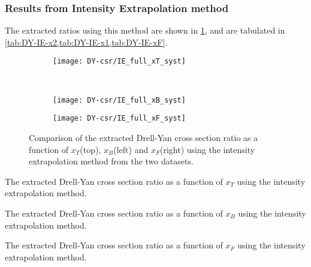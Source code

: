 \documentclass[../main.tex]{subfiles}
\begin{document}
\subsubsection{Results from Intensity Extrapolation method}
The extracted ratios using this method are shown in \cref{fig:CSR_IE},
and are tabulated in \cref{tab:DY-IE-x2,tab:DY-IE-x1,tab:DY-IE-xF}.
\begin{figure}[h!]
	\centering
	\begin{subfigure}{0.6\linewidth}
		\texttt{[image: DY-csr/IE\_full\_xT\_syst]}
	\end{subfigure}\\
	\begin{subfigure}{0.45\linewidth}
		\texttt{[image: DY-csr/IE\_full\_xB\_syst]}
	\end{subfigure}
	\begin{subfigure}{0.45\linewidth}
		\texttt{[image: DY-csr/IE\_full\_xF\_syst]}
	\end{subfigure}
	\caption{Comparison of the extracted Drell-Yan cross section ratio as a function of $x_T$(top),
		$x_B$(left) and $x_F$(right) using the intensity extrapolation method from the two datasets.}
	\label{fig:CSR_IE}
\end{figure}

\begin{table}[h!]
	\centering
	\caption{The extracted Drell-Yan cross section ratio as a function of $x_T$ using the intensity extrapolation method.}
	\label{tab:DY-IE-x2}
	
\end{table}
\begin{table}[h!]
	\centering
	\caption{The extracted Drell-Yan cross section ratio as a function of $x_B$ using the intensity extrapolation method.}
	\label{tab:DY-IE-x1}
	
\end{table}
\begin{table}[h!]
	\centering
	\caption{The extracted Drell-Yan cross section ratio as a function of $x_F$ using the intensity extrapolation method.}
	\label{tab:DY-IE-xF}
	
\end{table}
\FloatBarrier
\end{document}
